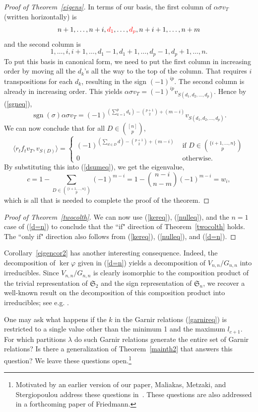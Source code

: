 \documentclass[12pt]{amsart}
\numberwithin{equation}{section}
\DeclareMathOperator{\sgn}{sgn}
\def\sg{\mathfrak S}
\begin{document}
\begin{proof}[Proof of Theorem~\ref{eigens}]
In terms of our basis, the first column of 
$ \alpha \sigma v_T$ (written horizontally) is   $$n+1, \ldots , n+i, {\color{red} d_1}, \ldots , {\color{red} d_p}, n+i+1,  \ldots , n+m$$ and the second column is $$1, \ldots , i, i+1, \ldots, d_1-1, d_1+1, \ldots, d_p-1, d_p+1, \ldots ,n . $$
To put this basis in canonical form, we need to put the first column in  increasing order by moving all the $d_k$'s all the way to the top of the column. That requires $i$ transpositions for each $d_k$, resulting in the sign $(-1)^{ip}$. The second column is already in increasing order.
This yields $ \alpha \sigma v_T =  (-1)^{ip} v_{S(d_1,d_2,\dots,d_p)}$.  
Hence by (\ref{sgneq}), $$\sgn(\sigma) \alpha \sigma v_T = (-1)^{\left (\sum_{k=1}^p d_k \right)-\binom {p+1}2  + (m-i)}v_{S(d_1,d_2,\dots,d_p)}.$$
We can now conclude that for all $D\in \binom{[n]}p$,
$$\langle r_t f_t v_T, v_{S(D)} \rangle = \begin{cases}  (-1)^{\left (\sum_{d \in D} d \right) -{p+1\choose 2} +(m-i)} &\mbox{ if } D \in \binom{\{i+1,\dots ,n\}} p \\
0 &\mbox{ otherwise.}\end{cases} $$
By substituting this into (\ref{dsumeq}), we get the eigenvalue,
$$c = 1- \sum_{D \in \binom{\{i+1,\dots ,n\}} p} (-1)^{m-i} = 1 - \binom{n-i}{n-m} (-1)^{m-i} = w_i, $$
which is all that is needed to complete the proof of the theorem.
\end{proof}


 \begin{proof}[Proof of Theorem~\ref{twocolth}]  
We can now use  (\ref{kereq}), (\ref{nulleq}), and the $n=1$ case of (\ref{d=n}) to conclude that the ``if" direction of Theorem~\ref{twocolth} holds.  The ``only if" direction also follows from  (\ref{kereq}), (\ref{nulleq}), and   (\ref{d=n}). 
\end{proof}



\vspace{.1in} Corollary~\ref{eigencor2}  has another interesting consequence.  Indeed, the decomposition  of   $\ker\varphi$ given in (\ref{d=n}) yields a  decomposition of $V_{n,n}/G_{n,n}$ into irreducibles.  Since $V_{n,n}/G_{n,n}$ is clearly isomorphic to the composition product  of the trivial representation of $\sg_2$ and the sign representation  of $\sg_n$, we recover a well-known result on the decomposition of this composition product into irreducibles; see e.g. \cite[p. 140]{Mac}.

One may ask what happens if the  $k$ in the Garnir relations  (\ref{garnireq}) is restricted to a single value other than the minimum 1 and the maximum $l_{c+1}$.   For which partitions $\lambda$ do such Garnir relations generate the entire set of  Garnir relations? Is there a
generalization of Theorem~\ref{mainth2} that answers this question?  We leave these questions open.\footnote{Motivated by an earlier version of our paper,
Maliakas, Metzaki, and  Stergiopoulou address these questions in~\cite{MMS}.  These questions are also addressed in a  forthcoming paper of Friedmann.}
\end{document}
